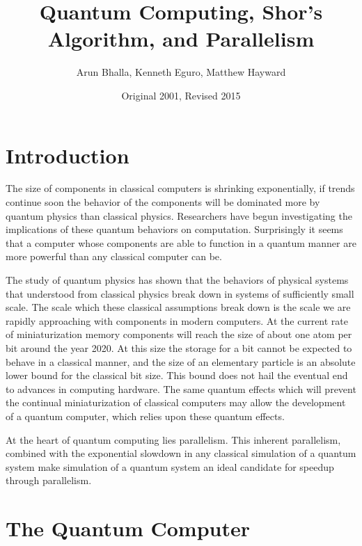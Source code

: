 \documentclass[]{article}
\begin{document}
\title{Quantum Computing, Shor's Algorithm, and Parallelism}
\date{Original 2001, Revised 2015}
\author{Arun Bhalla, Kenneth Eguro, Matthew Hayward}
\maketitle
\pagebreak

\tableofcontents

\pagebreak

\section{Introduction}

The size of components in classical computers is shrinking
exponentially, if trends continue soon the behavior of the components
will be dominated more by quantum physics than classical physics.
Researchers have begun investigating the implications of these quantum
behaviors on computation. Surprisingly it seems that a computer whose
components are able to function in a quantum manner are more powerful
than any classical computer can be.

The study of quantum physics has shown that the behaviors of physical
systems that understood from classical physics break down in systems
of sufficiently small scale. The scale which these classical
assumptions break down is the scale we are rapidly approaching with
components in modern computers. At the current rate of
miniaturization memory components will reach the size of about one
atom per bit around the year 2020. At this size the storage for a bit
cannot be expected to behave in a classical manner, and the size of an
elementary particle is an absolute lower bound for the classical bit
size. This bound does not hail the eventual end to advances in
computing hardware. The same quantum effects which will prevent the
continual miniaturization of classical computers may allow the
development of a quantum computer, which relies upon these quantum
effects.

At the heart of quantum computing lies parallelism.  This inherent
parallelism, combined with the exponential slowdown in any classical
simulation of a quantum system make simulation of a quantum system an
ideal candidate for speedup through parallelism.  
	
\section{The Quantum Computer}
\end{document}
